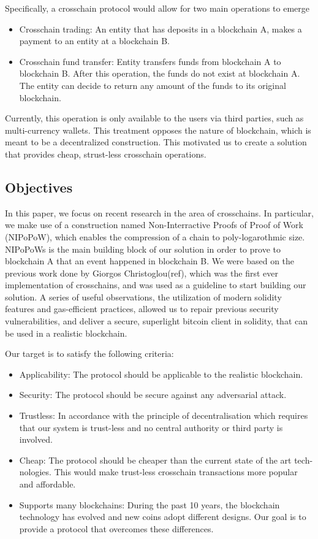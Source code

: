 \documentclass{article}
\begin{document}
Specifically, a crosschain protocol would allow for two main operations to emerge
\begin{itemize}
\item Crosschain trading: An entity that has deposits in a blockchain A, makes
    a payment to an entity at a blockchain B.
\item Crosschain fund transfer: Entity transfers funds from blockchain A to
    blockchain B. After this operation, the funds do not exist at blockchain A.
    The entity can decide to return any amount of the funds to its original blockchain.
\end{itemize}

Currently, this operation is only available to the users via third parties,
such as multi-currency wallets. This treatment opposes the nature of
blockchain, which is meant to be a decentralized construction. This motivated
us to create a solution that provides cheap, strust-less crosschain operations.

\subsection{Objectives}

In this paper, we focus on recent research in the area of crosschains. In
particular, we make use of a construction named Non-Interractive Proofs of
Proof of Work (NIPoPoW), which enables the compression of a chain to
poly-logarothmic size. NIPoPoWs is the main building block of our solution in
order to prove to blockchain A that an event happened in blockchain B. We were
based on the previous work done by Giorgos Christoglou(ref), which was the
first ever implementation of crosschains, and was used as a guideline to start
building our solution.
A series of useful observations, the utilization of modern solidity features
and gas-efficient practices, allowed us to repair previous security
vulnerabilities, and deliver a secure, superlight bitcoin client in solidity,
that can be used in a realistic blockchain.

Our target is to satisfy the following criteria:
\begin{itemize}
\item Applicability: The protocol should be applicable to the realistic
    blockchain.
\item Security: The protocol should be secure against any adversarial attack.
\item Trustless: In accordance with the principle of decentralisation which
    requires that our system is trust-less and no central authority or third
    party is involved.
\item Cheap: The protocol should be cheaper than the current state of the art
    tech-nologies. This would make trust-less crosschain transactions more
    popular and affordable.
\item Supports many blockchains: During the past 10 years, the blockchain
    technology has evolved and new coins adopt different designs. Our goal is
    to provide a protocol that overcomes these differences.
\end{itemize}
\end{document}
